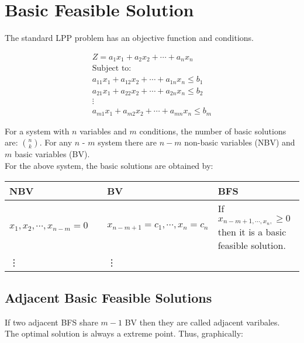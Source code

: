 \documentclass[openany, oneside]{book}
\begin{document}
\section{Basic Feasible Solution}
The standard LPP problem has an objective function and conditions.
\begin{center}
\begin{align*}
Z = a_1 x_1 + a_2 x_2 + \cdots + a_n x_n\\
\text{Subject to:}\\
a_{11} x_{1} + a_{12} x_{2} + \cdots + a_{1n}x_n \leq b_1\\
a_{21} x_{1} + a_{22} x_{2} + \cdots + a_{2n}x_n \leq b_2\\
\vdots\\
a_{m1} x_{1} + a_{m2} x_{2} + \cdots + a_{mn}x_n \leq b_m
\end{align*}
\end{center}
For a system with $n$ variables and $m$ conditions, the number of basic solutions are: ${n\choose k}$.
For any $n$ - $m$ system there are $n-m$ non-basic variables (NBV) and $m$ basic variables (BV).\\
For the above system, the basic solutions are obtained by:\\
\begin{table}[ht]
\centering
\begin{tabular}{|p{0.35\linewidth} | p{0.35\linewidth}| p{0.3\linewidth}|}
\hline
NBV & BV & BFS\\
\hline
$x_1,x_2,\cdots,x_{n-m} = 0$ & $x_{n-m+1} = c_1, \cdots , x_n = c_n$ & If $x_{n-m+1, \cdots , x_n,} \geq 0$ then it is a basic feasible solution.\\
\vdots & \vdots & \\
\hline
\end{tabular}
\end{table}

\subsection{Adjacent Basic Feasible Solutions}
If two adjacent BFS share $m-1$ BV then they are called adjacent varibales.\\
The optimal solution is always a extreme point. Thus, graphically:
\end{document}
